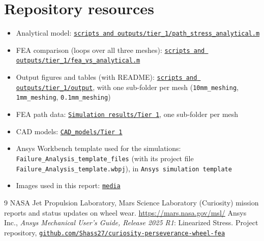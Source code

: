 \documentclass[10pt,a4paper]{article}
\newcommand{\repo}{https://github.com/Shass27/curiosity-perseverance-wheel-fea}
\newcommand{\tree}{\repo/tree/main}
\newcommand{\blob}{\repo/blob/main}
\begin{document}
\section*{Repository resources}
\begin{itemize}\raggedright\setlength\itemsep{0pt}
  \item Analytical model: \href{\blob/scripts\%20and\%20outputs/tier_1/path_stress_analytical.m}{\texttt{scripts and outputs/tier\_1/path\_stress\_analytical.m}}
  \item FEA comparison (loops over all three meshes): \href{\blob/scripts\%20and\%20outputs/tier_1/fea_vs_analytical.m}{\texttt{scripts and outputs/tier\_1/fea\_vs\_analytical.m}}
  \item Output figures and tables (with README): \href{\tree/scripts\%20and\%20outputs/tier_1/output}{\texttt{scripts and outputs/tier\_1/output}}, with one sub-folder per mesh (\texttt{10mm\_meshing}, \texttt{1mm\_meshing}, \texttt{0.1mm\_meshing})
  \item FEA path data: \href{\tree/Simulation\%20results/Tier\%201}{\texttt{Simulation results/Tier 1}}, one sub-folder per mesh
  \item CAD models: \href{\tree/CAD_models/Tier\%201}{\texttt{CAD\_models/Tier 1}}
  \item Ansys Workbench template used for the simulations: \texttt{Failure\_Analysis\_template\_files} (with its project file \texttt{Failure\_Analysis\_template.wbpj}), in \texttt{Ansys simulation template}
  \item Images used in this report: \href{\tree/media}{\texttt{media}}
\end{itemize}

\begin{thebibliography}{9}
   NASA Jet Propulsion Laboratory, Mars Science Laboratory (Curiosity) mission reports and status updates on wheel wear. \url{https://mars.nasa.gov/msl/}
   Ansys Inc., \emph{Ansys Mechanical User's Guide, Release 2025 R1}: Linearized Stress.
   Project repository, \href{\repo}{\texttt{github.com/Shass27/curiosity-perseverance-wheel-fea}}
\end{thebibliography}
\end{document}

